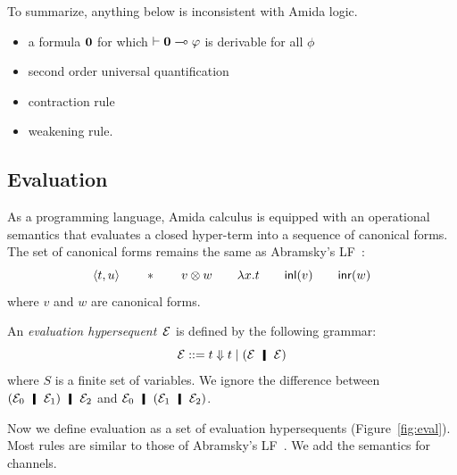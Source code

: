  To summarize, anything below is inconsistent with Amida logic.
 \begin{itemize}
  \item a formula $\mathbf{0}$ for which $\vdash\mathbf{0}\multimap\varphi$ is derivable for
	all $\phi$
  \item second order universal quantification
  \item contraction rule
  \item weakening rule.
 \end{itemize}

\subsection{Evaluation}

As a programming language, Amida calculus is equipped with an
operational semantics that evaluates a closed hyper-term into a sequence
of canonical forms.
The set of canonical forms remains the same as Abramsky's
LF~\citep{abramsky1993computational}:
\[
 \langle{t,u}\rangle\qquad \ast\qquad v\otimes w\qquad \lambda
 x.t\qquad \mathsf{inl}({v})\qquad\mathsf{inr}({w})
\]
where $v$ and $w$ are canonical forms.

An \textit{evaluation
hypersequent}~$\mathcal{E}$ is defined by the following
grammar:
\[
 \hypere ::= t\eval t\mid (\hypere\hmid \hypere)
\]
where $S$ is a finite set of variables.
We ignore the difference between $(\hypere_0\hmid \hypere_1)\hmid
\hypere_2$ and $\hypere_0\hmid(\hypere_1\hmid\hypere_2)$.

Now we define evaluation as a set of evaluation hypersequents
(Figure~\ref{fig:eval}).
Most rules are similar to those of Abramsky's
LF~\citep{abramsky1993computational}.
We add the semantics for channels.


